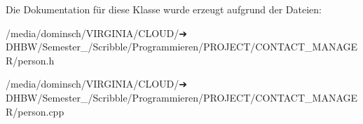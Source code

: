 Die Dokumentation für diese Klasse wurde erzeugt aufgrund der Dateien\+:\begin{DoxyCompactItemize}
\item 
/media/dominsch/\+V\+I\+R\+G\+I\+N\+I\+A/\+C\+L\+O\+U\+D/➔ D\+H\+B\+W/\+Semester\+\_/\+Scribble/\+Programmieren/\+P\+R\+O\+J\+E\+C\+T/\+C\+O\+N\+T\+A\+C\+T\+\_\+\+M\+A\+N\+A\+G\+E\+R/person.\+h\item 
/media/dominsch/\+V\+I\+R\+G\+I\+N\+I\+A/\+C\+L\+O\+U\+D/➔ D\+H\+B\+W/\+Semester\+\_/\+Scribble/\+Programmieren/\+P\+R\+O\+J\+E\+C\+T/\+C\+O\+N\+T\+A\+C\+T\+\_\+\+M\+A\+N\+A\+G\+E\+R/person.\+cpp\end{DoxyCompactItemize}
